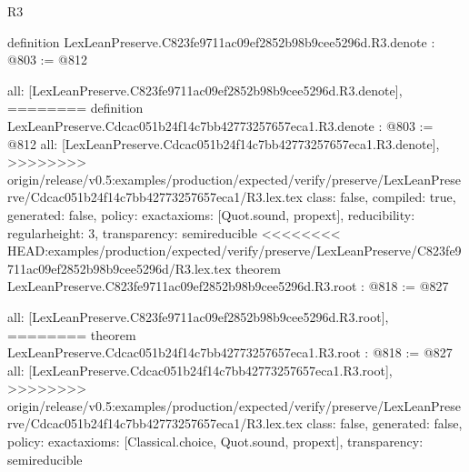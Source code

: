 \begin{lexlean}{R3}
\begin{coremodule}
{{{{{{definition LexLeanPreserve.C823fe9711ac09ef2852b98b9cee5296d.R3.denote : @803 := @812 {
  all: [LexLeanPreserve.C823fe9711ac09ef2852b98b9cee5296d.R3.denote],
========
definition LexLeanPreserve.Cdcac051b24f14c7bb42773257657eca1.R3.denote : @803 := @812 {
  all: [LexLeanPreserve.Cdcac051b24f14c7bb42773257657eca1.R3.denote],
>>>>>>>> origin/release/v0.5:examples/production/expected/verify/preserve/LexLeanPreserve/Cdcac051b24f14c7bb42773257657eca1/R3.lex.tex
  class: false,
  compiled: true,
  generated: false,
  policy: exact{axioms: [Quot.sound, propext]},
  reducibility: regular{height: 3},
  transparency: semireducible
}
<<<<<<<< HEAD:examples/production/expected/verify/preserve/LexLeanPreserve/C823fe9711ac09ef2852b98b9cee5296d/R3.lex.tex
theorem LexLeanPreserve.C823fe9711ac09ef2852b98b9cee5296d.R3.root : @818 := @827 {
  all: [LexLeanPreserve.C823fe9711ac09ef2852b98b9cee5296d.R3.root],
========
theorem LexLeanPreserve.Cdcac051b24f14c7bb42773257657eca1.R3.root : @818 := @827 {
  all: [LexLeanPreserve.Cdcac051b24f14c7bb42773257657eca1.R3.root],
>>>>>>>> origin/release/v0.5:examples/production/expected/verify/preserve/LexLeanPreserve/Cdcac051b24f14c7bb42773257657eca1/R3.lex.tex
  class: false,
  generated: false,
  policy: exact{axioms: [Classical.choice, Quot.sound, propext]},
  transparency: semireducible
}

}}}}}}}}
\end{coremodule}
\end{lexlean}
